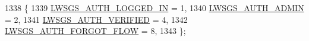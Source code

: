 \begin{DoxyCode}
1338                      \{
1339         \hyperlink{group__generic-sessions_gga7c2dc7bfb4ccb91c5d771f9e9ea237e1a81e63075115dedd150265d81b8f7fa57}{LWSGS\_AUTH\_LOGGED\_IN} = 1, 
1340         \hyperlink{group__generic-sessions_gga7c2dc7bfb4ccb91c5d771f9e9ea237e1a0657a9e846814781b128c397fe4b10bf}{LWSGS\_AUTH\_ADMIN} = 2,   
1341         \hyperlink{group__generic-sessions_gga7c2dc7bfb4ccb91c5d771f9e9ea237e1a5a607e4668d20cadada62c4b8007f887}{LWSGS\_AUTH\_VERIFIED} = 4,  
1342         \hyperlink{group__generic-sessions_gga7c2dc7bfb4ccb91c5d771f9e9ea237e1a2cd8fb86e3b85c106e7711c03f0ddd0a}{LWSGS\_AUTH\_FORGOT\_FLOW} = 8,       
1343 \};
\end{DoxyCode}
